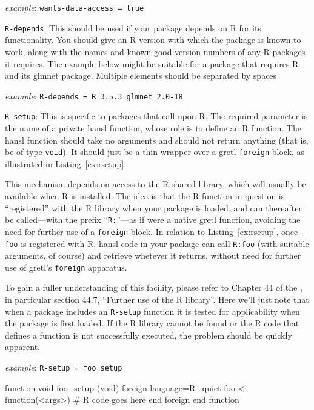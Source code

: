\documentclass[oneside]{book}
\newcommand{\ttusage}[1]{\textit{example}: \quad \texttt{#1}}
\begin{document}
\begin{description}
  \ttusage{wants-data-access = true}

\item \texttt{R-depends}: This should be used if your package depends
  on \textsf{R} for its functionality. You should give an \textsf{R}
  version with which the package is known to work, along with the
  names and known-good version numbers of any \textsf{R} packages it
  requires. The example below might be suitable for a package that
  requires \textsf{R} and its \textsf{glmnet} package. Multiple
  elements should be separated by spaces

  \ttusage{R-depends = R 3.5.3 glmnet 2.0-18}

\item \texttt{R-setup}: This is specific to packages that call upon
  \textsf{R}. The required parameter is the name of a private hansl
  function, whose role is to define an \textsf{R} function. The hansl
  function should take no arguments and should not return anything
  (that is, be of type \texttt{void}). It should just be a thin
  wrapper over a gretl \texttt{foreign} block, as illustrated in
  Listing~\ref{ex:rsetup}.

  This mechanism depends on access to the \textsf{R} shared library,
  which will usually be available when \textsf{R} is installed. The
  idea is that the \textsf{R} function in question is ``registered''
  with the \textsf{R} library when your package is loaded, and can
  thereafter be called---with the prefix ``\texttt{R:}''---as if were
  a native gretl function, avoiding the need for further use of a
  \texttt{foreign} block. In relation to Listing~\ref{ex:rsetup}, once
  \texttt{foo} is registered with \textsf{R}, hansl code in your
  package can call \texttt{R:foo} (with suitable arguments, of course)
  and retrieve whetever it returns, without need for further use of
  gretl's \texttt{foreign} apparatus.

  To gain a fuller understanding of this facility, please refer to
  Chapter 44 of the \GUG, in particular section 44.7, ``Further use of
  the R library''. Here we'll just note that when a package includes
  an \texttt{R-setup} function it is tested for applicability when the
  package is first loaded. If the \textsf{R} library cannot be found
  or the \textsf{R} code that defines a function is not successfully
  executed, the problem should be quickly apparent.

  \ttusage{R-setup = foo\_setup}

\begin{script}[htbp]
  \caption{Example of an \texttt{R-setup} function}
  \label{ex:rsetup}
\begin{code}
   function void foo_setup (void)
      foreign language=R --quiet
      foo <- function(<args>) {
         # R code goes here
      }
      end foreign
   end function
\end{code}
\end{script}

\end{description}
\end{document}
